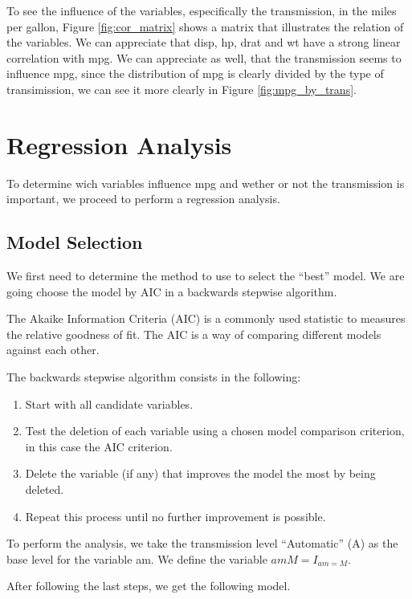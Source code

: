 \documentclass[]{article}
\begin{document}
To see the influence of the variables, especifically the transmission,
in the miles per gallon, Figure \ref{fig:cor_matrix} shows a matrix that
illustrates the relation of the variables. We can appreciate that disp,
hp, drat and wt have a strong linear correlation with mpg. We can
appreciate as well, that the transmission seems to influence mpg, since
the distribution of mpg is clearly divided by the type of transimission,
we can see it more clearly in Figure \ref{fig:mpg_by_trans}.

\section{Regression Analysis}

To determine wich variables influence mpg and wether or not the
transmission is important, we proceed to perform a regression analysis.

\subsection{Model Selection}

We first need to determine the method to use to select the ``best''
model. We are going choose the model by AIC in a backwards stepwise
algorithm.

The Akaike Information Criteria (AIC) is a commonly used statistic to
measures the relative goodness of fit. The AIC is a way of comparing
different models against each other.

The backwards stepwise algorithm consists in the following:

\begin{enumerate}
\def\labelenumi{\arabic{enumi}.}
\itemsep1pt\parskip0pt
\item
  Start with all candidate variables.
\item
  Test the deletion of each variable using a chosen model comparison
  criterion, in this case the AIC criterion.
\item
  Delete the variable (if any) that improves the model the most by being
  deleted.
\item
  Repeat this process until no further improvement is possible.
\end{enumerate}

To perform the analysis, we take the transmission level ``Automatic''
(A) as the base level for the variable am. We define the variable
\(amM = I_{am=M}\).

After following the last steps, we get the following model.
\end{document}
